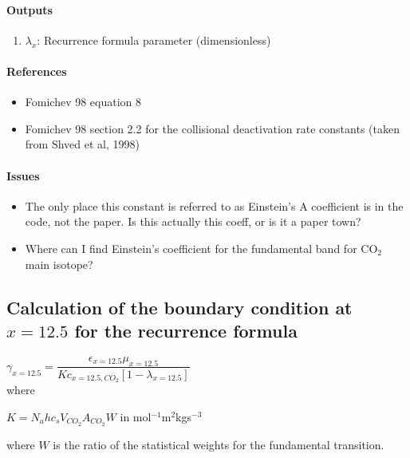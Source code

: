    \paragraph{Outputs}
   \begin{enumerate}
   \item $\lambda_x$: Recurrence formula parameter (dimensionless)
   \end{enumerate}

   \paragraph{References}
   \begin{itemize}
   \item Fomichev 98 equation 8
   \item Fomichev 98 section 2.2 for the collisional deactivation rate 
     constants (taken from Shved et al, 1998)
   \end{itemize}

   \paragraph{Issues}
   \begin{itemize}
   \item The only place this constant is referred to as Einstein's A
     coefficient is in the code, not the paper. Is this actually this
     coeff, or is it a paper town?
   \item Where can I find Einstein's coefficient for the fundamental band 
     for CO$_2$ main isotope?
   \end{itemize}


\subsection{Calculation of the boundary condition at $x=12.5$ for the 
    recurrence formula}

   $\gamma_{x=12.5} = \dfrac{\epsilon_{x=12.5}\mu_{x=12.5}}{K c_{x=12.5,CO_2}[1 - \lambda_{x=12.5}]}$ \\

   \noindent where

   \noindent $K = N_ahc_sV_{CO_2}A_{CO_2}W$ in mol$^{-1}$m$^2$kgs$^{-3}$
   
   \noindent where $W$ is the ratio of the statistical weights for the fundamental transition.

